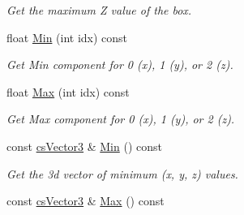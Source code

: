 \begin{DoxyCompactItemize}
\begin{DoxyCompactList}\small\item\em Get the maximum Z value of the box. \end{DoxyCompactList}\item 
float \hyperlink{classcsBox3_aaee257765252b6978de14c635995f31f}{Min} (int idx) const \hypertarget{classcsBox3_aaee257765252b6978de14c635995f31f}{}\label{classcsBox3_aaee257765252b6978de14c635995f31f}

\begin{DoxyCompactList}\small\item\em Get Min component for 0 (x), 1 (y), or 2 (z). \end{DoxyCompactList}\item 
float \hyperlink{classcsBox3_a77ef61cc6b6d9d6bca11e7dd03199d31}{Max} (int idx) const \hypertarget{classcsBox3_a77ef61cc6b6d9d6bca11e7dd03199d31}{}\label{classcsBox3_a77ef61cc6b6d9d6bca11e7dd03199d31}

\begin{DoxyCompactList}\small\item\em Get Max component for 0 (x), 1 (y), or 2 (z). \end{DoxyCompactList}\item 
const \hyperlink{classcsVector3}{cs\+Vector3} \& \hyperlink{classcsBox3_a57e7ebc42b8d8e0379dbde60a1443122}{Min} () const \hypertarget{classcsBox3_a57e7ebc42b8d8e0379dbde60a1443122}{}\label{classcsBox3_a57e7ebc42b8d8e0379dbde60a1443122}

\begin{DoxyCompactList}\small\item\em Get the 3d vector of minimum (x, y, z) values. \end{DoxyCompactList}\item 
const \hyperlink{classcsVector3}{cs\+Vector3} \& \hyperlink{classcsBox3_a3086d59f7c2dd2d5ad71f5d0d911f001}{Max} () const \hypertarget{classcsBox3_a3086d59f7c2dd2d5ad71f5d0d911f001}{}\label{classcsBox3_a3086d59f7c2dd2d5ad71f5d0d911f001}


\end{DoxyCompactItemize}
